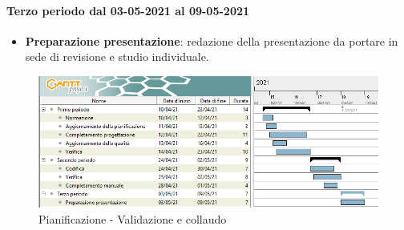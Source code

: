 \paragraph{Terzo periodo dal 03-05-2021 al 09-05-2021} 
\begin{itemize} 
	\item \textbf{Preparazione presentazione}: redazione della presentazione da portare in sede di revisione e studio individuale. 
\end{itemize} 

\newpage 
\begin{landscape} 
	\begin{figure}[h!] 
		\includegraphics[width=24cm]{images/5_Validazione_e_collaudo.png} 
		\caption{Pianificazione - Validazione e collaudo} 
	\end{figure} 
\end{landscape} 
